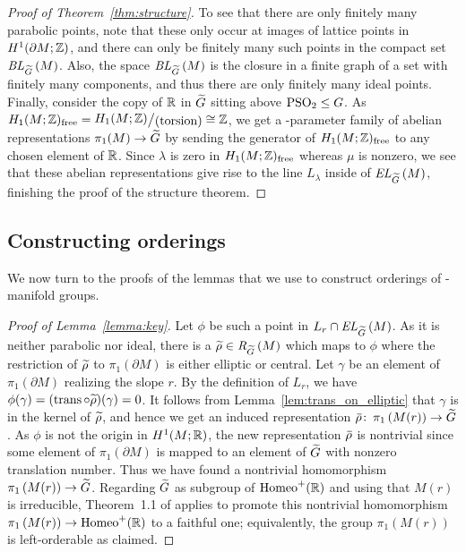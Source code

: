 \documentclass[tikz, sepfignums, defaultenums]{nmd/article}
\newcommand{\RGtil}[1]{\mathit{R}_{\Gtil}\left(#1\right)}
\DeclareMathOperator{\trans}{trans}
\newcommand{\TEL}[1]{\mathit{EL}_\Gtil\left(#1\right)}
\newcommand{\TELquo}[1]{\mathit{BL}_\Gtil\left(#1\right)}
\newcommand{\Honefree}{H_1(M; \Z)_{\mathrm{free}}}
\newcommand{\Honefreedef}{%
\rightquom{H_1(M; \Z)}{(\mathrm{torsion})}{1pt}{\big}}
\begin{document}
\begin{proof}[Proof of Theorem~\ref{thm:structure}]
To see that there are only finitely many parabolic points, note that
these only occur at images of lattice points in $H^1(\partial M; {\mathbb Z})$,
and there can only be finitely many such points in the compact set
$\TELquo{M}$.  Also, the space $\TELquo{M}$ is the closure in a finite
graph of a set with finitely many components, and thus there are only
finitely many ideal points.  Finally, consider the copy of ${\mathbb R}$ in
$\Gtil$ sitting above $\mathrm{PSO}_2 \leq G$.  As $\Honefree = \Honefreedef \cong \Z$, we
get a \1-parameter family of abelian representations
$\pi_1(M) \to \Gtil$ by sending the generator of $\Honefree$
to any chosen element of ${\mathbb R}$.  Since $\lambda$ is zero in
$\Honefree$ whereas $\mu$ is nonzero, we see that these abelian
representations give rise to the line $L_\lambda$ inside of $\TEL{M}$,
finishing the proof of the structure theorem. 
\end{proof}

\subsection{Constructing orderings}  We now turn to the proofs of
the lemmas that we use to construct orderings of \3-manifold groups.

\begin{proof}[Proof of Lemma~\ref{lemma:key}]
Let $\phi$ be such a point in $L_r \cap \TEL{M}$.  As it is neither
parabolic nor ideal, there is a $\rhotil \in \RGtil{M}$ which maps to
$\phi$ where the restriction of $\rhotil$ to $\pi_1(\partial M)$ is
either elliptic or central. Let $\gamma$ be an element of
$\pi_1(\partial M)$ realizing the slope $r$.  By the definition of
$L_r$, we have $\phi(\gamma) = (\trans \circ \rhotil)(\gamma) = 0$.
It follows from Lemma~\ref{lem:trans_on_elliptic} that $\gamma$ is in
the kernel of $\rhotil$, and hence we get an induced representation
$\rhobar \maps \pi_1\left( M(r) \right) \to \Gtil$.  As $\phi$ is not
the origin in $H^1(M;{\mathbb R})$, the new representation $\rhobar$ is
nontrivial since some element of $\pi_1(\partial M)$ is mapped to an
element of $\Gtil$ with nonzero translation number. Thus we have found
a nontrivial homomorphism $\pi_1\left(M(r)\right) \to \Gtil$.
Regarding $\Gtil$ as subgroup of $\operatorname{Homeo}^+({\mathbb R})$ and using that $M(r)$
is irreducible, Theorem~1.1 of \cite{BoyerRolfsenWiest2005} applies to
promote this nontrivial homomorphism
$\pi_1\left( M(r)\right) \to \operatorname{Homeo}^+({\mathbb R})$ to a faithful one;
equivalently, the group $\pi_1\left( M(r) \right)$ is left-orderable
as claimed.
\end{proof}
\end{document}
